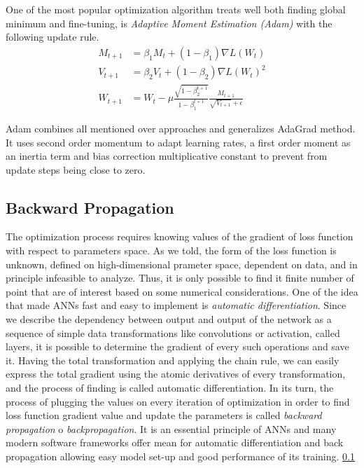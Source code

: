 One of the most popular optimization algorithm treats well both finding global minimum and fine-tuning, is \textit{Adaptive Moment Estimation (Adam)} with the following update rule.
\begin{align*}
	M_{t+1} & = \beta_{1}M_{t} + (1-\beta_{1})\nabla L(W_{t}) \\
	V_{t+1} & = \beta_{2} V_{t} + (1-\beta_{2})\nabla L(W_{t})^2 \\
	W_{t+1} & = W_{t} - \mu \frac{\sqrt{1-\beta_{2}^{t+1}}}{1-\beta_{1}^{t+1}} \frac{M_{t+1}}{\sqrt{V_{t+1}}+\epsilon}
\end{align*}		

Adam combines all mentioned over approaches and generalizes AdaGrad method.
It uses second order momentum to adapt learning rates, a first order moment as an inertia term and bias correction multiplicative constant to prevent from update steps being close to zero.

\subsection{Backward Propagation}

The optimization process requires knowing values of the gradient of loss function with respect to parameters space.
As we told, the form of the loss function is unknown, defined on high-dimensional prameter space, dependent on data, and in principle infeasible to analyze.
Thus, it is only possible to find it finite number of point that are of interest based on some numerical considerations.
One of the idea that made ANNs fast and easy to implement is \textit{automatic differentiation}.
Since we describe the dependency between output and output of the network as a sequence of simple data transformations like convolutions or activation, called layers, it is possible to determine the gradient of every such operations and save it.
Having the total transformation and applying the chain rule, we can easily express the total gradient using the atomic derivatives of every transformation, and the process of finding is called automatic differentiation. 
In its turn, the process of plugging the values on every iteration of optimization in order to find loss function gradient value and update the parameters is called \textit{backward propagation} o \textit{backpropagation}.
It is an essential principle of ANNs and many modern software frameworks offer mean for automatic differentiation and back propagation allowing easy model set-up and good performance of its training. \ref{} 



